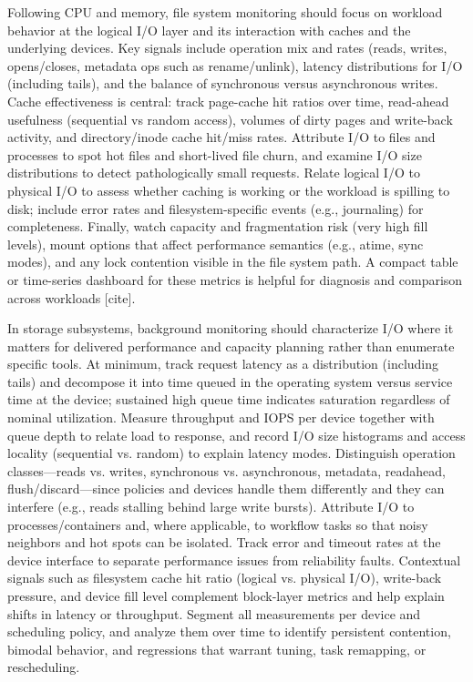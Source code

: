 Following CPU and memory, file system monitoring should focus on workload behavior at the logical I/O layer and its interaction with caches and the underlying devices. Key signals include operation mix and rates (reads, writes, opens/closes, metadata ops such as rename/unlink), latency distributions for I/O (including tails), and the balance of synchronous versus asynchronous writes. Cache effectiveness is central: track page-cache hit ratios over time, read-ahead usefulness (sequential vs random access), volumes of dirty pages and write-back activity, and directory/inode cache hit/miss rates. Attribute I/O to files and processes to spot hot files and short-lived file churn, and examine I/O size distributions to detect pathologically small requests. Relate logical I/O to physical I/O to assess whether caching is working or the workload is spilling to disk; include error rates and filesystem-specific events (e.g., journaling) for completeness. Finally, watch capacity and fragmentation risk (very high fill levels), mount options that affect performance semantics (e.g., atime, sync modes), and any lock contention visible in the file system path. A compact table or time-series dashboard for these metrics is helpful for diagnosis and comparison across workloads [cite].

In storage subsystems, background monitoring should characterize I/O where it matters for delivered performance and capacity planning rather than enumerate specific tools. At minimum, track request latency as a distribution (including tails) and decompose it into time queued in the operating system versus service time at the device; sustained high queue time indicates saturation regardless of nominal utilization. Measure throughput and IOPS per device together with queue depth to relate load to response, and record I/O size histograms and access locality (sequential vs. random) to explain latency modes. Distinguish operation classes—reads vs. writes, synchronous vs. asynchronous, metadata, readahead, flush/discard—since policies and devices handle them differently and they can interfere (e.g., reads stalling behind large write bursts). Attribute I/O to processes/containers and, where applicable, to workflow tasks so that noisy neighbors and hot spots can be isolated. Track error and timeout rates at the device interface to separate performance issues from reliability faults. Contextual signals such as filesystem cache hit ratio (logical vs. physical I/O), write-back pressure, and device fill level complement block-layer metrics and help explain shifts in latency or throughput. Segment all measurements per device and scheduling policy, and analyze them over time to identify persistent contention, bimodal behavior, and regressions that warrant tuning, task remapping, or rescheduling.


